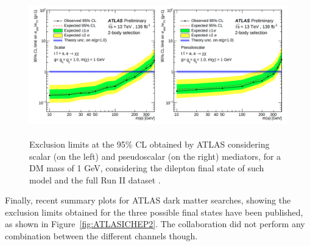 \documentclass[a4paper, 10pt, openright]{report}
\begin{document}
 \begin{figure}[htbp]
\centering
\includegraphics[width=14cm, height=6.2cm]{figs/ATLASICHEP.png}
\caption{Exclusion limits at the 95\% \ac{CL} obtained by \ac{ATLAS} considering  scalar (on the left) and pseudoscalar (on the right) mediators, for a \ac{DM} mass of 1 GeV, considering the dilepton final state of such model and the full Run II dataset \cite{PreviousDoubleTopBottomAllLep13ATLAS}.}\label{fig:ATLASICHEP}
\end{figure}

Finally, recent summary plots for ATLAS dark matter searches, showing the exclusion limits obtained for the three possible final states have been published, as shown in Figure~\ref{fig:ATLASICHEP2}. The collaboration did not perform any combination between the different channels though.
\end{document}
